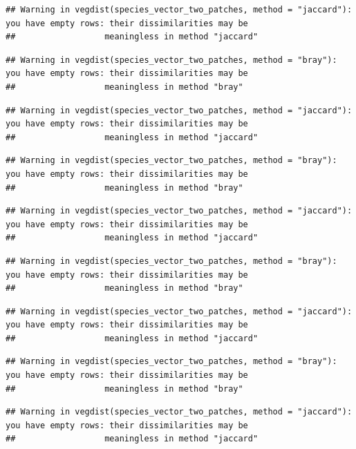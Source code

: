 \documentclass[
]{article}
\begin{document}
\begin{verbatim}
## Warning in vegdist(species_vector_two_patches, method = "jaccard"): you have empty rows: their dissimilarities may be
##                  meaningless in method "jaccard"
\end{verbatim}

\begin{verbatim}
## Warning in vegdist(species_vector_two_patches, method = "bray"): you have empty rows: their dissimilarities may be
##                  meaningless in method "bray"
\end{verbatim}

\begin{verbatim}
## Warning in vegdist(species_vector_two_patches, method = "jaccard"): you have empty rows: their dissimilarities may be
##                  meaningless in method "jaccard"
\end{verbatim}

\begin{verbatim}
## Warning in vegdist(species_vector_two_patches, method = "bray"): you have empty rows: their dissimilarities may be
##                  meaningless in method "bray"
\end{verbatim}

\begin{verbatim}
## Warning in vegdist(species_vector_two_patches, method = "jaccard"): you have empty rows: their dissimilarities may be
##                  meaningless in method "jaccard"
\end{verbatim}

\begin{verbatim}
## Warning in vegdist(species_vector_two_patches, method = "bray"): you have empty rows: their dissimilarities may be
##                  meaningless in method "bray"
\end{verbatim}

\begin{verbatim}
## Warning in vegdist(species_vector_two_patches, method = "jaccard"): you have empty rows: their dissimilarities may be
##                  meaningless in method "jaccard"
\end{verbatim}

\begin{verbatim}
## Warning in vegdist(species_vector_two_patches, method = "bray"): you have empty rows: their dissimilarities may be
##                  meaningless in method "bray"
\end{verbatim}

\begin{verbatim}
## Warning in vegdist(species_vector_two_patches, method = "jaccard"): you have empty rows: their dissimilarities may be
##                  meaningless in method "jaccard"
\end{verbatim}
\end{document}
